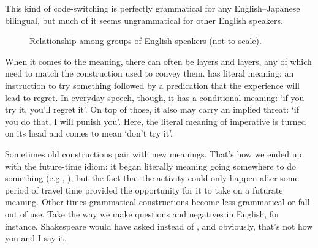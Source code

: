 This kind of code-switching is perfectly grammatical for any English--Japanese bilingual, but much of it seems ungrammatical for other English speakers.

\begin{figure} \label{fig:speaker-groups}
\caption{Relationship among groups of English speakers (not to scale).}
\label{fig:speaker_groups}
\end{figure}


When it comes to the meaning, there can often be layers and layers, any of which need to match the construction used to convey them.  has literal meaning: an instruction to try something followed by a predication that the experience will lead to regret. In everyday speech, though, it has a conditional meaning: `if you try it, you'll regret it'. On top of those, it also may carry an implied threat: `if you do that, I will punish you'. Here, the literal meaning of imperative  is turned on its head and comes to mean `don't try it'.

Sometimes old constructions pair with new meanings. That's how we ended up with the  future-time idiom: it began literally meaning going somewhere to do something (e.g., ), but the fact that the activity could only happen after some period of travel time provided the opportunity for it to take on a futurate meaning. Other times grammatical constructions become less grammatical or fall out of use. Take the way we make questions and negatives in English, for instance. Shakespeare would have asked  instead of , and obviously, that's not how you and I say it.



